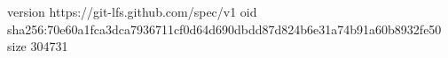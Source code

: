 version https://git-lfs.github.com/spec/v1
oid sha256:70e60a1fca3dca7936711cf0d64d690dbdd87d824b6e31a74b91a60b8932fe50
size 304731

